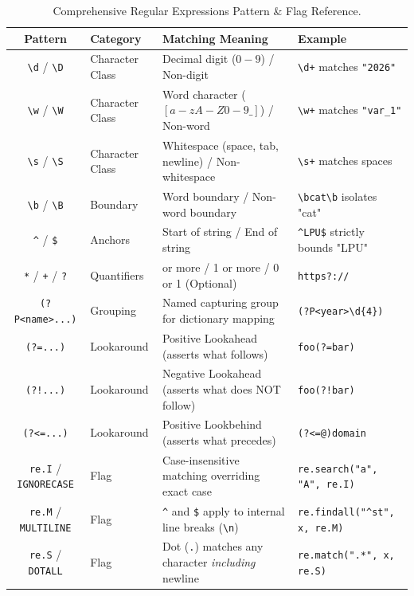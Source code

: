 \begin{table}[htbp]
\centering
\small
\renewcommand{\arraystretch}{1.2}
\begin{tabularx}{\linewidth}{cl>{\raggedright\arraybackslash}Xl}
\toprule
\textbf{Pattern} & \textbf{Category} & \textbf{Matching Meaning} & \textbf{Example} \\
\midrule
\texttt{\textbackslash d} / \texttt{\textbackslash D} & Character Class & Decimal digit ($0-9$) / Non-digit & \texttt{\textbackslash d+} matches \texttt{"2026"} \\
\texttt{\textbackslash w} / \texttt{\textbackslash W} & Character Class & Word character ($[a-zA-Z0-9\_]$) / Non-word & \texttt{\textbackslash w+} matches \texttt{"var\_1"} \\
\texttt{\textbackslash s} / \texttt{\textbackslash S} & Character Class & Whitespace (space, tab, newline) / Non-whitespace & \texttt{\textbackslash s+} matches spaces \\
\texttt{\textbackslash b} / \texttt{\textbackslash B} & Boundary & Word boundary / Non-word boundary & \texttt{\textbackslash bcat\textbackslash b} isolates "cat" \\
\texttt{\textasciicircum} / \texttt{\$} & Anchors & Start of string / End of string & \texttt{\textasciicircum LPU\$} strictly bounds "LPU" \\
\texttt{*} / \texttt{+} / \texttt{?} & Quantifiers & 0 or more / 1 or more / 0 or 1 (Optional) & \texttt{https?://} \\
\texttt{(?P<name>...)} & Grouping & Named capturing group for dictionary mapping & \texttt{(?P<year>\textbackslash d\{4\})} \\
\texttt{(?=...)} & Lookaround & Positive Lookahead (asserts what follows) & \texttt{foo(?=bar)} \\
\texttt{(?!...)} & Lookaround & Negative Lookahead (asserts what does NOT follow) & \texttt{foo(?!bar)} \\
\texttt{(?<=...)} & Lookaround & Positive Lookbehind (asserts what precedes) & \texttt{(?<=@)domain} \\
\midrule
\texttt{re.I} / \texttt{IGNORECASE} & Flag & Case-insensitive matching overriding exact case & \texttt{re.search("a", "A", re.I)} \\
\texttt{re.M} / \texttt{MULTILINE} & Flag & \texttt{\textasciicircum} and \texttt{\$} apply to internal line breaks (\texttt{\textbackslash n}) & \texttt{re.findall("\textasciicircum st", x, re.M)} \\
\texttt{re.S} / \texttt{DOTALL} & Flag & Dot (\texttt{.}) matches any character \textit{including} newline & \texttt{re.match(".*", x, re.S)} \\
\bottomrule
\end{tabularx}
\caption{Comprehensive Regular Expressions Pattern \& Flag Reference.}
\label{tab:master-regex}
\end{table}

